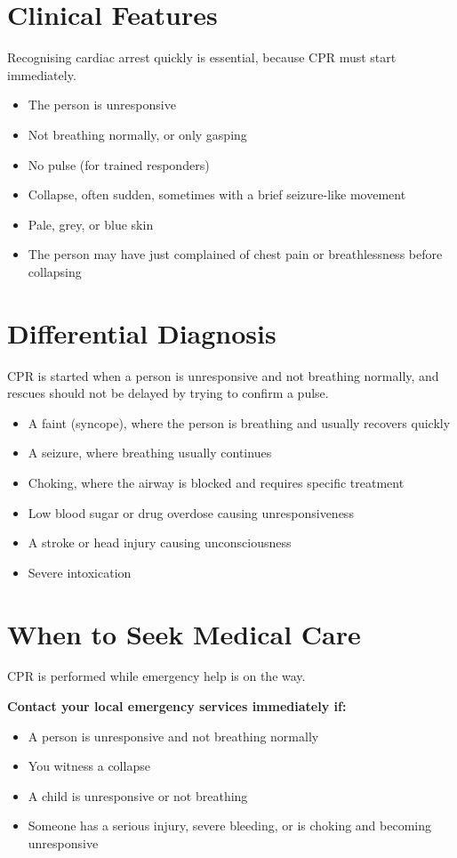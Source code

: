 \section*{Clinical Features}
Recognising cardiac arrest quickly is essential, because CPR must start immediately.

\begin{itemize}
    \item The person is unresponsive
    \item Not breathing normally, or only gasping
    \item No pulse (for trained responders)
    \item Collapse, often sudden, sometimes with a brief seizure-like movement
    \item Pale, grey, or blue skin
    \item The person may have just complained of chest pain or breathlessness before collapsing
\end{itemize}

\section*{Differential Diagnosis}
CPR is started when a person is unresponsive and not breathing normally, and rescues should not be delayed by trying to confirm a pulse.

\begin{itemize}
    \item A faint (syncope), where the person is breathing and usually recovers quickly
    \item A seizure, where breathing usually continues
    \item Choking, where the airway is blocked and requires specific treatment
    \item Low blood sugar or drug overdose causing unresponsiveness
    \item A stroke or head injury causing unconsciousness
    \item Severe intoxication
\end{itemize}

\section*{When to Seek Medical Care}
CPR is performed while emergency help is on the way.

\textbf{Contact your local emergency services immediately if:}
\begin{itemize}
    \item A person is unresponsive and not breathing normally
    \item You witness a collapse
    \item A child is unresponsive or not breathing
    \item Someone has a serious injury, severe bleeding, or is choking and becoming unresponsive
\end{itemize}


